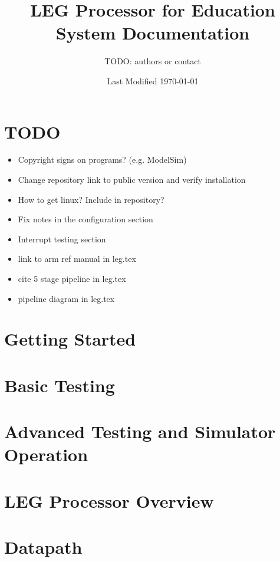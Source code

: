 \documentclass[12pt]{article}
\begin{document}
\title{LEG Processor for Education\\\Large{System Documentation}
}
\author{TODO: authors or contact}
\date{Last Modified \today}
\maketitle
\thispagestyle{empty}
\pagebreak
\setcounter{page}{1}
\pagebreak

\tableofcontents
\pagebreak

\section{TODO}
\begin{itemize}
\item Copyright signs on programs? (e.g. ModelSim)
\item Change repository link to public version and verify installation
\item How to get linux? Include in repository?
\item Fix notes in the configuration section
\item Interrupt testing section
\item link to arm ref manual in leg.tex
\item cite 5 stage pipeline in leg.tex
\item pipeline diagram in leg.tex
\end{itemize}

\section{Getting Started}


\section{Basic Testing}

\pagebreak

\section{Advanced Testing and Simulator Operation}

\pagebreak

\section{LEG Processor Overview}


\section{Datapath}

\end{document}

